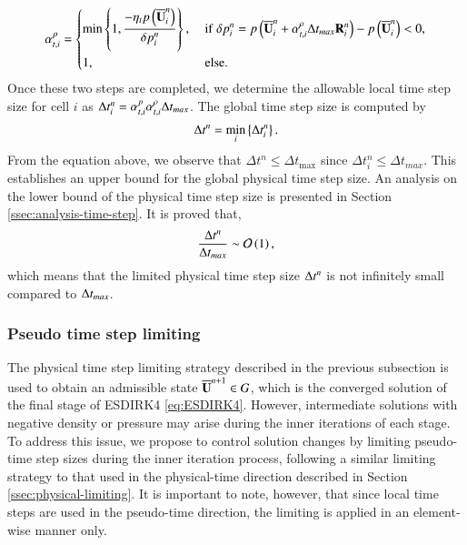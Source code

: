 \begin{equation}
\label{eq:alpha-t-p}
    \alpha_{t,i}^{p} = \begin{dcases}
        \min\left\{1, \dfrac{-\eta_t p \left(\UM^n_i\right)}{\delta p_i^n} \right\}, & \ 
        \mathrm{if} \ \delta p_i^n=  p \left(\UM^n_i + \alpha_{t,i}^{\rho} \inc t_{max} \R^n_i\right) -  p \left(\UM^n_i\right) <0, \\
        1, & \ \mathrm{else}.
    \end{dcases}
\end{equation}
Once these two steps are completed, we determine the allowable local time step size for cell $i$ as $\Delta t^n_i= \alpha_{t,i}^{p}  \alpha_{t,i}^{\rho} \mathrm\Delta t_{max}$.
The global time step size is computed by
\begin{equation}
    \label{eq:alpha-t-global}
    \mathrm\Delta t^n = \min_i \left\{\Delta t^n_i \right\}.
\end{equation}
From the equation above, we observe that $\Delta t^n \leq \Delta t_{\text{max}}$ since $\Delta t^n_i \leq \Delta t_{max}$. This establishes an upper bound for the global physical time step size.
An analysis on the lower bound of the physical time step size is presented in Section \ref{ssec:analysis-time-step}. It is proved that, 
\begin{equation}
    \dfrac{\mathrm\Delta t^n}{\mathrm\Delta t_{max}} \sim \mathcal{O} \left(1\right),
\end{equation}
which means that the limited physical time step size $\mathrm\Delta t^n$ is not infinitely small compared to $\mathrm\Delta t_{max}$.


\subsubsection{Pseudo time step limiting}
\label{ssec:pseudo-limiting}

The physical time step limiting strategy described in the previous subsection is used to obtain an admissible state $\overline{\mathbf{U}}^{n+1} \in G$, which is the converged solution of the final stage of ESDIRK4 \eqref{eq:ESDIRK4}. However, intermediate solutions with negative density or pressure may arise during the inner iterations of each stage. To address this issue, we propose to control solution changes by limiting pseudo-time step sizes during the inner iteration process, following a similar limiting strategy to that used in the physical-time direction described in Section \ref{ssec:physical-limiting}. It is important to note, however, that since local time steps are used in the pseudo-time direction, the limiting is applied in an element-wise manner only.

